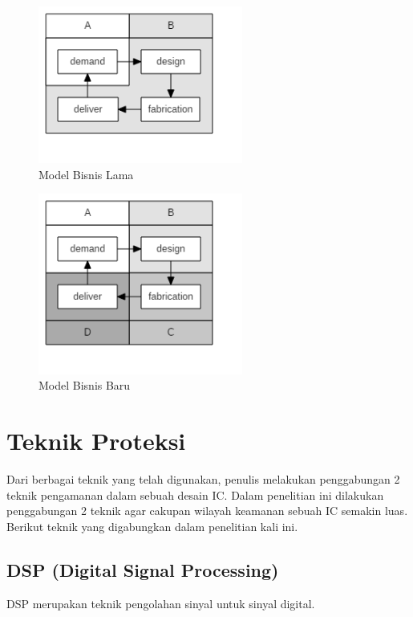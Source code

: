 \begin{figure}
	\centering
	\includegraphics[width=0.6\textwidth]
	{diagrams/oldBusinessLSI.png}
	\caption{Model Bisnis Lama}
	\label{fig:oldbiss}
\end{figure}

\begin{figure}
	\centering
	\includegraphics[width=0.6\textwidth]
	{diagrams/newBusinessLSI.png}
	\caption{Model Bisnis Baru}
	\label{fig:newbiss}
\end{figure}

\section{Teknik Proteksi}
Dari berbagai teknik yang telah digunakan, penulis melakukan penggabungan 2 teknik pengamanan dalam sebuah desain IC. Dalam penelitian ini dilakukan penggabungan 2 teknik agar cakupan wilayah keamanan sebuah IC semakin luas. Berikut teknik yang digabungkan dalam penelitian kali ini.

\subsection{DSP (Digital Signal Processing)}
DSP merupakan teknik pengolahan sinyal untuk sinyal digital.

